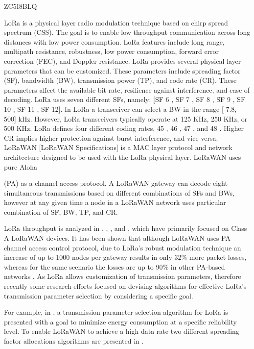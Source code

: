 \cite{farooq_search_2018} ZC5I8BLQ

LoRa is a physical layer radio modulation technique based on chirp spread spectrum (CSS).
The goal is to enable low throughput communication across long distances with low power consumption.
LoRa features include long range,
	multipath resistance,
	robustness,
	low power consumption,
	forward error correction (FEC),
	and Doppler resistance.
LoRa provides several physical layer parameters that can be customized.
These parameters include spreading factor (SF),
	bandwidth (BW),
	transmission power (TP),
	and code rate (CR).
These parameters affect the available bit rate,
	resilience against interference,
	and ease of decoding.
LoRa uses seven different SFs,
	namely:
	[SF 6 ,
	SF 7 ,
	SF 8 ,
	SF 9 ,
	SF 10 ,
	SF 11 ,
	SF 12].
In LoRa a transceiver can select a BW in the range [-7.8, 500] kHz.
However,
	LoRa transceivers typically operate at 125 KHz, 250 KHz,
	or 500 KHz.
LoRa defines four different coding rates, 45 , 46 , 47 ,
	and 48 .
Higher CR implies higher protection against burst interference,
	and vice versa.
LoRaWAN [LoRaWAN Speciﬁcations] is a MAC layer protocol and network architecture designed to be used with the LoRa physical layer.
LoRaWAN uses pure Aloha

(PA) as a channel access protocol.
A LoRaWAN gateway can decode eight simultaneous transmissions based on different combinations of SFs and BWs,
	however at any given time a node in a LoRaWAN network uses particular combination of SF,
	BW,
	TP,
	and CR.


LoRa throughput is analyzed in \cite{adelantado_understanding_2017},
	\cite{bor_lora_2016},
	\cite{jetmir_haxhibeqiri_lora_2017},
	and \cite{mikhaylov_analysis_2016},
	which have primarily focused on Class A LoRaWAN devices.
It has been shown that although LoRaWAN uses PA channel access control protocol,
	due to LoRa’s robust modulation technique an increase of up to 1000 nodes per gateway results in only 32\% more packet losses,
whereas for the same scenario the losses are up to 90\% in other PA-based networks \cite{jetmir_haxhibeqiri_lora_2017}.
As LoRa allows customization of transmission parameters,
	therefore recently some research efforts focused on devising algorithms for effective LoRa’s transmission parameter selection by considering a specific goal.

For example,
	in \cite{bor_lora_2017},
	a transmission parameter selection algorithm for LoRa is presented with a goal to minimize energy consumption at a specific reliability level.
To enable LoRaWAN to achieve a high data rate two different spreading factor allocations algorithms are presented in \cite{cuomo_explora_2017}.

